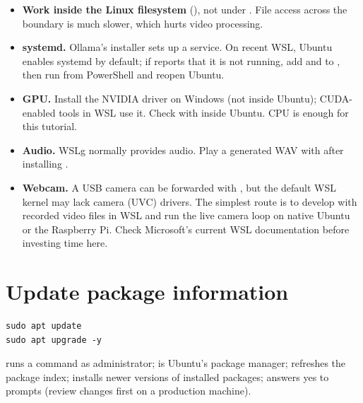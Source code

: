 \begin{notebox}
\begin{itemize}
  \item \textbf{Work inside the Linux filesystem} (\code{~/}), not under . File access across the boundary is much slower, which hurts video processing.
  \item \textbf{systemd.} Ollama's installer sets up a service. On recent WSL, Ubuntu enables systemd by default; if  reports that it is not running, add \code{[boot]} and  to , then run  from PowerShell and reopen Ubuntu.
  \item \textbf{GPU.} Install the NVIDIA driver on Windows (not inside Ubuntu); CUDA-enabled tools in WSL use it. Check with  inside Ubuntu. CPU is enough for this tutorial.
  \item \textbf{Audio.} WSLg normally provides audio. Play a generated WAV with  after installing .
  \item \textbf{Webcam.} A USB camera can be forwarded with , but the default WSL kernel may lack camera (UVC) drivers. The simplest route is to develop with recorded video files in WSL and run the live camera loop on native Ubuntu or the Raspberry Pi. Check Microsoft's current WSL documentation before investing time here.
\end{itemize}
\end{notebox}

\section{Update package information}
\begin{lstlisting}[style=sh]
sudo apt update
sudo apt upgrade -y
\end{lstlisting}
 runs a command as administrator;  is Ubuntu's package manager;  refreshes the package index;  installs newer versions of installed packages;  answers yes to prompts (review changes first on a production machine).

